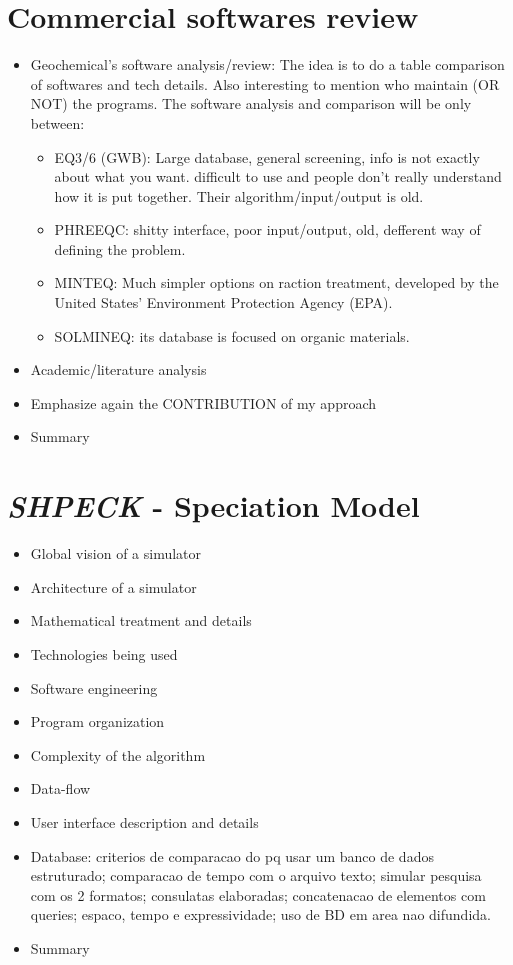 \documentclass[ppgc,mestrado,english]{iiufrgs}
\begin{document}
\chapter{Commercial softwares review}
\label{chapter:review}

\begin{itemize}
\item Geochemical's software analysis/review: The idea is to do a table comparison of softwares and tech details. Also interesting to mention who maintain (OR NOT) the programs. The software analysis and comparison will be only between:
\begin{itemize}
\item EQ3/6 (GWB): Large database, general screening, info is not exactly about what you want. difficult to use and people don't really understand how it is put together. Their algorithm/input/output is old. 
\item PHREEQC: shitty interface, poor input/output, old, defferent way of defining the problem.
\item MINTEQ: Much simpler options on raction treatment, developed by the United States' Environment Protection Agency (EPA). 
\item SOLMINEQ: its database is focused on organic materials.
\end{itemize}
\item Academic/literature analysis
\item Emphasize again the CONTRIBUTION of my approach
\item Summary
\end{itemize}


\chapter{\emph{SHPECK} - Speciation Model}
\label{chapter:SHPECK}
\begin{itemize}
\item	Global vision of a simulator
\item	Architecture of a simulator
\item	Mathematical treatment and details
\item	Technologies being used
\item	Software engineering
\item	Program organization
\item	Complexity of the algorithm
\item	Data-flow
\item	User interface description and details
\item	Database: criterios de comparacao do pq usar um banco de dados estruturado; comparacao de tempo com o arquivo texto; simular pesquisa com os 2 formatos; consulatas elaboradas; concatenacao de elementos com queries; espaco, tempo e expressividade; uso de BD em area nao difundida.
\item	Summary
\end{itemize}
\end{document}
